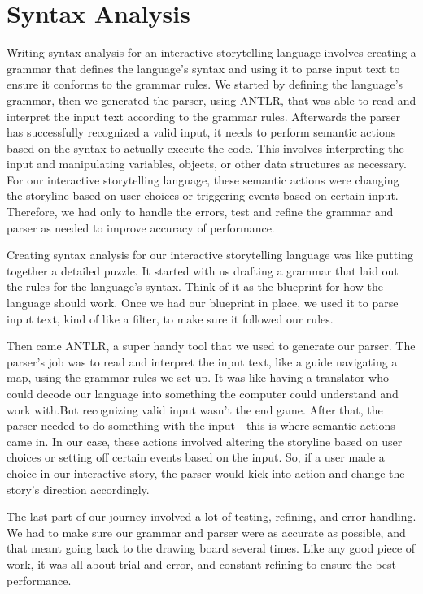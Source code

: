 \section{Syntax Analysis}
Writing syntax analysis for an interactive storytelling language involves creating a grammar that defines the language's syntax and using it to parse input text to ensure it conforms to the grammar rules. We started by defining the language’s grammar, then we generated the parser, using ANTLR, that was able to read and interpret the input text according to the grammar rules. Afterwards the parser has successfully recognized a valid input, it needs to perform semantic actions based on the syntax to actually execute the code. This involves interpreting the input and manipulating variables, objects, or other data structures as necessary. For our interactive storytelling language, these semantic actions were changing the storyline based on user choices or triggering events based on certain input. Therefore, we had only to handle the errors, test and refine the grammar and parser as needed to improve accuracy of performance.

Creating syntax analysis for our interactive storytelling language was like putting together a detailed puzzle. It started with us drafting a grammar that laid out the rules for the language's syntax. Think of it as the blueprint for how the language should work. Once we had our blueprint in place, we used it to parse input text, kind of like a filter, to make sure it followed our rules.

Then came ANTLR, a super handy tool that we used to generate our parser. The parser's job was to read and interpret the input text, like a guide navigating a map, using the grammar rules we set up. It was like having a translator who could decode our language into something the computer could understand and work with.But recognizing valid input wasn't the end game. After that, the parser needed to do something with the input - this is where semantic actions came in. In our case, these actions involved altering the storyline based on user choices or setting off certain events based on the input. So, if a user made a choice in our interactive story, the parser would kick into action and change the story's direction accordingly.

The last part of our journey involved a lot of testing, refining, and error handling. We had to make sure our grammar and parser were as accurate as possible, and that meant going back to the drawing board several times. Like any good piece of work, it was all about trial and error, and constant refining to ensure the best performance.

